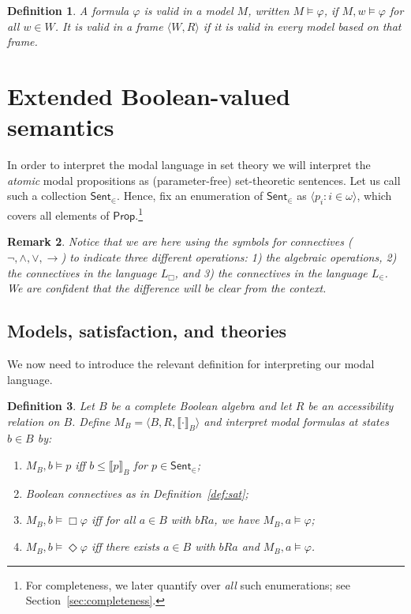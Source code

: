 \documentclass[10pt,a4paper]{amsart}
\newtheorem{definition}{Definition}[section]
\newtheorem{remark}[definition]{Remark}
\newcommand{\Prop}{\mathsf{Prop}}
\newcommand{\Sent}{\mathsf{Sent}}
\newcommand{\val}[1]{\llbracket #1\rrbracket_B}
\begin{document}
\begin{definition}
A formula $\varphi$ is \emph{valid in a model} $M$, written $M\models \varphi$, if $M,w\models\varphi$ for all
$w\in W$. It is \emph{valid in a frame} $\langle W,R\rangle$ if it is valid in every model based on that frame.
\end{definition}

\section{Extended Boolean-valued semantics}\label{sec:extended-semantics}

In order to interpret the modal language in set theory we will interpret the \emph{atomic} modal propositions as (parameter-free) set-theoretic sentences. Let us call such a collection $\Sent_{\in}$.
Hence, fix an enumeration of $\Sent_{\in}$ as $\langle p_i:i\in\omega\rangle$, which covers all elements of $\Prop$.\footnote{For completeness, we later quantify over \emph{all} such enumerations; see Section~\ref{sec:completeness}.}

\begin{remark}
Notice that we are here using the symbols for connectives ($\neg, \land,  \lor, \to$) to indicate three different operations: 1) the algebraic operations, 2) the connectives in the language $L_\Box$, and 3) the connectives in the language $L_\in$. We are confident that the difference will be clear from the context.
\end{remark}

\subsection{Models, satisfaction, and theories}

We now need to introduce the relevant definition for interpreting our modal language.

\begin{definition}\label{def:MB}
Let $B$ be a complete Boolean algebra and let $R$ be an accessibility relation on $B$.
Define $M_B=\langle B,R,\val{\cdot}\rangle$ and interpret modal formulas at states $b\in B$ by:
\begin{enumerate}[label=(\roman*)]
\item $M_B,b\models p$ iff $b\le \val{p}$ for $p\in\Sent_{\in}$;
\item Boolean connectives as in Definition~\ref{def:sat};
\item $M_B,b\models \Box\varphi$ iff for all $a\in B$ with $bRa$, we have $M_B,a\models \varphi$;
\item $M_B,b\models \Diamond\varphi$ iff there exists $a\in B$ with $bRa$ and $M_B,a\models\varphi$.
\end{enumerate}
\end{definition}
\end{document}
